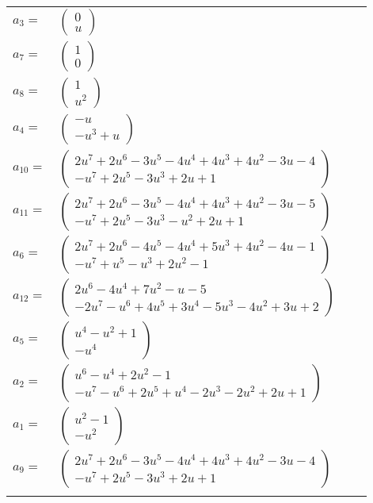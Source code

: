 \documentclass[1p]{elsarticle_modified}
\theoremstyle{definition}
\begin{document}
\begin{tabular}{m{7pt} m{180pt} m{7pt} m{180pt} }
\flushright $a_{3}=$&$\begin{pmatrix}0\\u\end{pmatrix}$ \\
\flushright $a_{7}=$&$\begin{pmatrix}1\\0\end{pmatrix}$ \\
\flushright $a_{8}=$&$\begin{pmatrix}1\\u^2\end{pmatrix}$ \\
\flushright $a_{4}=$&$\begin{pmatrix}- u\\- u^3+u\end{pmatrix}$ \\
\flushright $a_{10}=$&$\begin{pmatrix}2 u^7+2 u^6-3 u^5-4 u^4+4 u^3+4 u^2-3 u-4\\- u^7+2 u^5-3 u^3+2 u+1\end{pmatrix}$ \\
\flushright $a_{11}=$&$\begin{pmatrix}2 u^7+2 u^6-3 u^5-4 u^4+4 u^3+4 u^2-3 u-5\\- u^7+2 u^5-3 u^3- u^2+2 u+1\end{pmatrix}$ \\
\flushright $a_{6}=$&$\begin{pmatrix}2 u^7+2 u^6-4 u^5-4 u^4+5 u^3+4 u^2-4 u-1\\- u^7+u^5- u^3+2 u^2-1\end{pmatrix}$ \\
\flushright $a_{12}=$&$\begin{pmatrix}2 u^6-4 u^4+7 u^2- u-5\\-2 u^7- u^6+4 u^5+3 u^4-5 u^3-4 u^2+3 u+2\end{pmatrix}$ \\
\flushright $a_{5}=$&$\begin{pmatrix}u^4- u^2+1\\- u^4\end{pmatrix}$ \\
\flushright $a_{2}=$&$\begin{pmatrix}u^6- u^4+2 u^2-1\\- u^7- u^6+2 u^5+u^4-2 u^3-2 u^2+2 u+1\end{pmatrix}$ \\
\flushright $a_{1}=$&$\begin{pmatrix}u^2-1\\- u^2\end{pmatrix}$ \\
\flushright $a_{9}=$&$\begin{pmatrix}2 u^7+2 u^6-3 u^5-4 u^4+4 u^3+4 u^2-3 u-4\\- u^7+2 u^5-3 u^3+2 u+1\end{pmatrix}$\\&\end{tabular}
\end{document}

